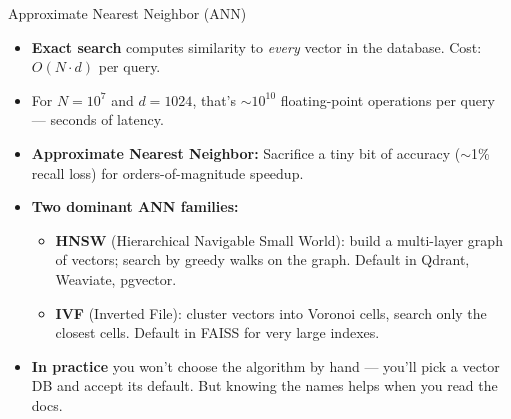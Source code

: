 \documentclass[10pt,english,aspectratio=169]{beamer}
\begin{document}
\begin{frame}{Approximate Nearest Neighbor (ANN)}
\begin{itemize}
\item \textbf{Exact search} computes similarity to \emph{every} vector in the database. Cost: $O(N \cdot d)$ per query.

\medskip
\item For $N = 10^7$ and $d = 1024$, that's $\sim$$10^{10}$ floating-point operations per query --- seconds of latency.

\medskip
\item \textbf{Approximate Nearest Neighbor:} Sacrifice a tiny bit of accuracy ($\sim$1\% recall loss) for orders-of-magnitude speedup.

\medskip
\item \textbf{Two dominant ANN families:}
\begin{itemize}
    \item \textbf{HNSW} (Hierarchical Navigable Small World): build a multi-layer graph of vectors; search by greedy walks on the graph. Default in Qdrant, Weaviate, pgvector.
    \item \textbf{IVF} (Inverted File): cluster vectors into Voronoi cells, search only the closest cells. Default in FAISS for very large indexes.
\end{itemize}

\medskip
\item \textbf{In practice} you won't choose the algorithm by hand --- you'll pick a vector DB and accept its default. But knowing the names helps when you read the docs.
\end{itemize}
\end{frame}
\end{document}
